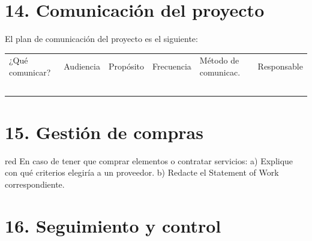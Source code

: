 \documentclass[11pt]{charter}
\begin{document}
\section{14. Comunicación del proyecto}
\label{sec:comunicaciones}

El plan de comunicación del proyecto es el siguiente:

\begin{table}[htpb]
\centering
\begin{tabularx}{\linewidth}{@{}|X|C{2.4cm}|C{3cm}|C{1.8cm}|C{2cm}|C{2.1cm}|@{}}
\hline
{} 
           \\ \hline
{} 
¿Qué comunicar? & Audiencia & Propósito & Frecuencia & Método de comunicac. & Responsable \\ \hline
                &           &           &            &                      &             \\ \hline
                &           &           &            &                      &             \\ \hline
                &           &           &            &                      &             \\ \hline
                &           &           &            &                      &             \\ \hline
                &           &           &            &                      &             \\ \hline
\end{tabularx}
\end{table}

\section{15. Gestión de compras}
\label{sec:compras}

\begin{consigna}{red}
En caso de tener que comprar elementos o contratar servicios:
a) Explique con qué criterios elegiría a un proveedor.
b) Redacte el Statement of Work correspondiente.
\end{consigna}

\section{16. Seguimiento y control}
\label{sec:seguimiento}
\end{document}
